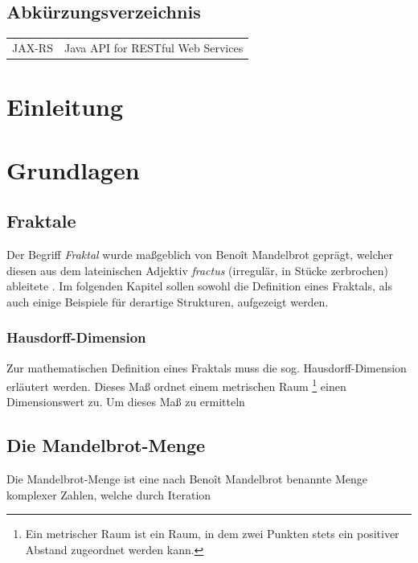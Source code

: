 \documentclass[a4paper,12pt,onesided]{report}
\begin{document}
\newpage
\listoffigures
{}

\newpage
\lstlistoflistings
{}

\newpage
\section*{Abkürzungsverzeichnis}
\begin{tabular}{ll}
  JAX-RS&Java API for RESTful Web Services\\
\end{tabular}

\newpage
\chapter{Einleitung}

\chapter{Grundlagen}
\section{Fraktale}
Der Begriff \textit{Fraktal} wurde maßgeblich von Benoît Mandelbrot geprägt, welcher diesen aus dem lateinischen Adjektiv
\textit{fractus} (irregulär, in Stücke zerbrochen) ableitete \cite{mandelbrot2013fraktale}. Im folgenden Kapitel sollen sowohl
die Definition eines Fraktals, als auch einige Beispiele für derartige Strukturen, aufgezeigt werden.
\subsection{Hausdorff-Dimension}
Zur mathematischen Definition eines Fraktals muss die sog. Hausdorff-Dimension erläutert werden. 
Dieses Maß ordnet einem metrischen Raum \footnote{Ein metrischer Raum ist ein Raum, in dem zwei Punkten
stets ein positiver Abstand zugeordnet werden kann.} einen Dimensionswert zu.
Um dieses Maß zu ermitteln %


\section{Die Mandelbrot-Menge}
Die Mandelbrot-Menge ist eine nach Benoît Mandelbrot benannte Menge komplexer Zahlen,
welche durch Iteration 

{}

\end{document}
